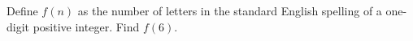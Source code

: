 Define $f(n)$ as the number of letters in the standard English spelling of a one-digit positive integer. Find $f(6)$.
